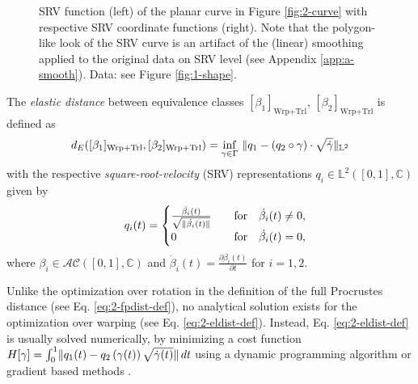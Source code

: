 \begin{figure}
  \centering
  \begin{subfigure}{.48\textwidth}
    \centering
  \end{subfigure}\hfill%
  \begin{subfigure}{.48\textwidth}
    \centering
    \begin{subfigure}{\textwidth}
      \centering
    \end{subfigure}
    \begin{subfigure}{\textwidth}
      \centering
    \end{subfigure}
  \end{subfigure}
  \caption{SRV function (left) of the planar curve in Figure \ref{fig:2-curve} with respective SRV coordinate functions (right). Note that the polygon-like look of the SRV curve is an artifact of the (linear) smoothing applied to the original data on SRV level (see Appendix \ref{app:a-smooth}). Data: see Figure \ref{fig:1-shape}.}
  \label{fig:2-srv}
\end{figure}

\begin{definition}
  \label{def:2-eldist}
  The \emph{elastic distance} between equivalence classes $[\beta_1]_{\text{Wrp} + \text{Trl}}$, $[\beta_2]_{\text{Wrp} + \text{Trl}}$ is defined as
  \begin{equation}
    \label{eq:2-eldist-def}
    d_{E}([\beta_1]_\text{Wrp+Trl}, [\beta_2]_\text{Wrp+Trl}) = \inf_{\gamma \in \Gamma} \,\, \lVert q_1 - ( q_2 \circ \gamma) \cdot \sqrt{\dot\gamma}\rVert_{\mathbb{L}^2}
  \end{equation}
  with the respective \emph{square-root-velocity} (SRV) representations $q_i \in \mathbb{L}^2([0,1],\mathbb{C})$ given by 
  \begin{equation}
   \quad q_i(t) = 
    \begin{cases}
      \frac{\dot{\beta_i}(t)}{\sqrt{\lVert\dot{\beta_i}(t)\rVert}} & \quad\text{for}\quad\dot{\beta_i}(t) \neq 0, \\
      0 & \quad\text{for}\quad\dot{\beta_i}(t) = 0,
    \end{cases}
  \end{equation}
  where $\beta_i \in \mathcal{AC}([0,1], \mathbb{C})$ and $\dot\beta_i(t) = \frac{\partial\beta_i(t)}{\partial t}$ for $i=1,2$.
\end{definition}

\noindent Unlike the optimization over rotation in the definition of the full Procrustes distance (see Eq. \ref{eq:2-fpdist-def}), no analytical solution exists for the optimization over warping (see Eq. \ref{eq:2-eldist-def}).
Instead, Eq. \ref{eq:2-eldist-def} is usually solved numerically, by minimizing a cost function $H[\gamma] = \int_0^1 \lVert q_1(t) - q_2\left( \gamma(t) \right) \sqrt{\dot\gamma(t)}\rVert\, dt$ using a dynamic programming algorithm \parencite[see e.g.][152]{SrivastavaKlassen2016} or gradient based methods \parencite[see e.g.][]{Steyer2021}.


